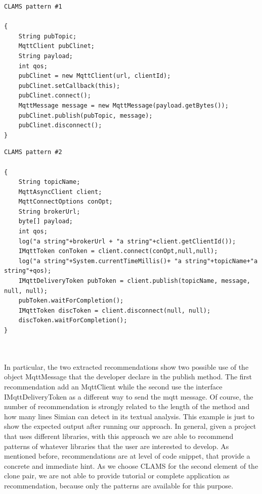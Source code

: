 \begin{minipage}[t]{0.5\textwidth}
\begin{lstlisting}
CLAMS pattern #1

{
    String pubTopic;
    MqttClient pubClinet;
    String payload;
    int qos;
    pubClinet = new MqttClient(url, clientId);
    pubClinet.setCallback(this);
    pubClinet.connect();
    MqttMessage message = new MqttMessage(payload.getBytes());
    pubClinet.publish(pubTopic, message);
    pubClinet.disconnect();
}
\end{lstlisting}
\end{minipage}
\begin{minipage}[t]{0.5\textwidth}

\begin{lstlisting}
CLAMS pattern #2

{
    String topicName;
    MqttAsyncClient client;
    MqttConnectOptions conOpt;
    String brokerUrl;
    byte[] payload;
    int qos;
    log("a string"+brokerUrl + "a string"+client.getClientId());
    IMqttToken conToken = client.connect(conOpt,null,null);
    log("a string"+System.currentTimeMillis()+ "a string"+topicName+"a string"+qos);
    IMqttDeliveryToken pubToken = client.publish(topicName, message, null, null);
    pubToken.waitForCompletion();
    IMqttToken discToken = client.disconnect(null, null);
    discToken.waitForCompletion();
}

	
\end{lstlisting}
\end{minipage}
\newline
In particular, the two extracted recommendations show two possible use of the object MqttMessage that the developer declare in the publish method. The first recommendation add an MqttClient while the second use the interface IMqttDeliveryToken as a different way to send the mqtt message. Of course, the number of recommendation is strongly related to the length of the method and how many lines Simian can detect in its textual analysis. This example is just to show the expected output after running our approach. In general, given a project that uses different libraries, with this approach we are able to recommend patterns of whatever libraries that the user are interested to develop. As mentioned before, recommendations are at level of code snippet, that provide a concrete and immediate hint. As we choose CLAMS for the second element of the clone pair, we are not able to provide tutorial or complete application as recommendation, because only the patterns are available for this purpose. \\
